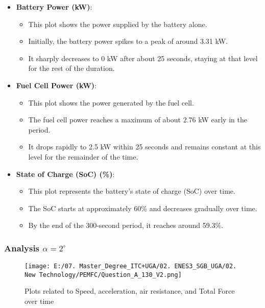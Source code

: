 \documentclass[12pt,a4paper]{article}
\numberwithin{equation}{section}
\begin{document}
{\begin{itemize}
	\item \textbf{Battery Power (kW)}:
	\begin{itemize}
		\item This plot shows the power supplied by the battery alone.
		\item Initially, the battery power spikes to a peak of around 3.31 kW.
		\item It sharply decreases to 0 kW after about 25 seconds, staying at that level for the rest of the duration.
	\end{itemize}
	
	\item \textbf{Fuel Cell Power (kW)}:
	\begin{itemize}
		\item This plot shows the power generated by the fuel cell.
		\item The fuel cell power reaches a maximum of about 2.76 kW early in the period.
		\item It drops rapidly to 2.5 kW within 25 seconds and remains constant at this level for the remainder of the time.
	\end{itemize}
	
	\item \textbf{State of Charge (SoC) (\%)}:
	\begin{itemize}
		\item This plot represents the battery’s state of charge (SoC) over time.
		\item The SoC starts at approximately 60\% and decreases gradually over time.
		\item By the end of the 300-second period, it reaches around 59.3\%.
	\end{itemize}
\end{itemize}





\subsubsection{Analysis $\alpha = 2^\circ$}


\begin{figure}[h]
	\centering 
	\texttt{[image: E:/07. Master\_Degree\_ITC+UGA/02. ENES3\_SGB\_UGA/02. New Technology/PEMFC/Question\_A\_130\_V2.png]}
	\caption{\small {Plots related to Speed, acceleration, air resistance, and Total Force over time}}
	\label{12}
\end{figure}

}
\end{document}
